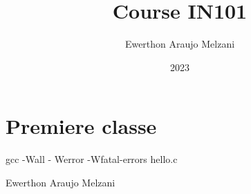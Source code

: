 \documentclass{article}
\title{Course IN101}
\author{Ewerthon Araujo Melzani}
\date{2023}
\begin{document}
\maketitle

\section*{Premiere classe}

\vspace*{1.5 cm}

gcc -Wall - Werror -Wfatal-errors hello.c

\vspace*{1.5 cm}



\LARGE Ewerthon Araujo Melzani
\end{document}
